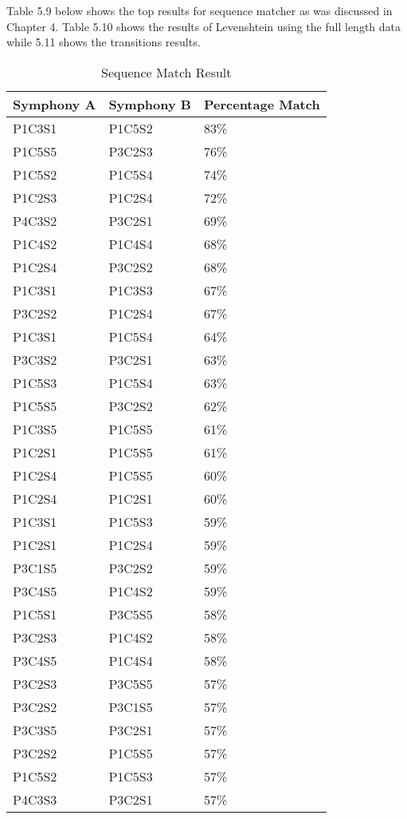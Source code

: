 Table 5.9 below shows the top results for sequence matcher as was discussed in Chapter 4. Table 5.10 shows the results of Levenshtein using the full length data while 5.11 shows the transitions results.

\begin{longtable}{|l|l|l|}
\caption{Sequence Match Result}
\label{my-label}\\
\hline
Symphony A & Symphony B & Percentage Match \\ \hline
\endfirsthead
%
\endhead
%
P1C3S1 & P1C5S2 & 83\% \\ \hline
P1C5S5 & P3C2S3 & 76\% \\ \hline
P1C5S2 & P1C5S4 & 74\% \\ \hline
P1C2S3 & P1C2S4 & 72\% \\ \hline
P4C3S2 & P3C2S1 & 69\% \\ \hline
P1C4S2 & P1C4S4 & 68\% \\ \hline
P1C2S4 & P3C2S2 & 68\% \\ \hline
P1C3S1 & P1C3S3 & 67\% \\ \hline
P3C2S2 & P1C2S4 & 67\% \\ \hline
P1C3S1 & P1C5S4 & 64\% \\ \hline
P3C3S2 & P3C2S1 & 63\% \\ \hline
P1C5S3 & P1C5S4 & 63\% \\ \hline
P1C5S5 & P3C2S2 & 62\% \\ \hline
P1C3S5 & P1C5S5 & 61\% \\ \hline
P1C2S1 & P1C5S5 & 61\% \\ \hline
P1C2S4 & P1C5S5 & 60\% \\ \hline
P1C2S4 & P1C2S1 & 60\% \\ \hline
P1C3S1 & P1C5S3 & 59\% \\ \hline
P1C2S1 & P1C2S4 & 59\% \\ \hline
P3C1S5 & P3C2S2 & 59\% \\ \hline
P3C4S5 & P1C4S2 & 59\% \\ \hline
P1C5S1 & P3C5S5 & 58\% \\ \hline
P3C2S3 & P1C4S2 & 58\% \\ \hline
P3C4S5 & P1C4S4 & 58\% \\ \hline
P3C2S3 & P3C5S5 & 57\% \\ \hline
P3C2S2 & P3C1S5 & 57\% \\ \hline
P3C3S5 & P3C2S1 & 57\% \\ \hline
P3C2S2 & P1C5S5 & 57\% \\ \hline
P1C5S2 & P1C5S3 & 57\% \\ \hline
P4C3S3 & P3C2S1 & 57\% \\ \hline
\end{longtable}

